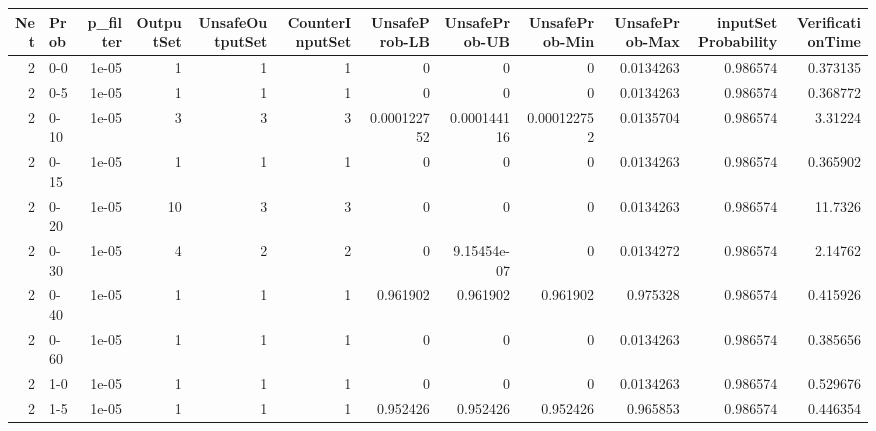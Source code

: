 \begin{tabular}{rlrrrrrrrrrr}
\hline
   Net & Prob   &   p\_filter &   OutputSet &   UnsafeOutputSet &   CounterInputSet &   UnsafeProb-LB &   UnsafeProb-UB &   UnsafeProb-Min &   UnsafeProb-Max &   inputSet Probability &   VerificationTime \\
\hline
     2 & 0-0    &      1e-05 &           1 &                 1 &                 1 &     0           &     0           &      0           &        0.0134263 &               0.986574 &           0.373135 \\
     2 & 0-5    &      1e-05 &           1 &                 1 &                 1 &     0           &     0           &      0           &        0.0134263 &               0.986574 &           0.368772 \\
     2 & 0-10   &      1e-05 &           3 &                 3 &                 3 &     0.000122752 &     0.000144116 &      0.000122752 &        0.0135704 &               0.986574 &           3.31224  \\
     2 & 0-15   &      1e-05 &           1 &                 1 &                 1 &     0           &     0           &      0           &        0.0134263 &               0.986574 &           0.365902 \\
     2 & 0-20   &      1e-05 &          10 &                 3 &                 3 &     0           &     0           &      0           &        0.0134263 &               0.986574 &          11.7326   \\
     2 & 0-30   &      1e-05 &           4 &                 2 &                 2 &     0           &     9.15454e-07 &      0           &        0.0134272 &               0.986574 &           2.14762  \\
     2 & 0-40   &      1e-05 &           1 &                 1 &                 1 &     0.961902    &     0.961902    &      0.961902    &        0.975328  &               0.986574 &           0.415926 \\
     2 & 0-60   &      1e-05 &           1 &                 1 &                 1 &     0           &     0           &      0           &        0.0134263 &               0.986574 &           0.385656 \\
     2 & 1-0    &      1e-05 &           1 &                 1 &                 1 &     0           &     0           &      0           &        0.0134263 &               0.986574 &           0.529676 \\
     2 & 1-5    &      1e-05 &           1 &                 1 &                 1 &     0.952426    &     0.952426    &      0.952426    &        0.965853  &               0.986574 &           0.446354 \\

\end{tabular}
